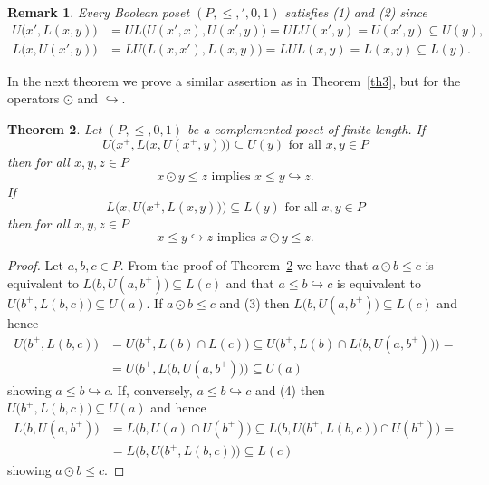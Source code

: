 \documentclass[12pt]{article}
\newtheorem{theorem}{Theorem}[section]
\newtheorem{remark}[theorem]{Remark}
\begin{document}
\begin{remark}
Every Boolean poset $(P,\le,{}',0,1)$ satisfies {\rm(1)} and {\rm(2)} since
\begin{align*}
U\big(x',L(x,y)\big) & =UL\big(U(x',x),U(x',y)\big)=ULU(x',y)=U(x',y)\subseteq U(y), \\
L\big(x,U(x',y)\big) & =LU\big(L(x,x'),L(x,y)\big)=LUL(x,y)=L(x,y)\subseteq L(y).
\end{align*}
\end{remark}	

In the next theorem we prove a similar assertion as in Theorem~\ref{th3}, but for the operators $\odot$ and $\hookrightarrow$.

\begin{theorem}\label{th4}
Let $(P,\le,0,1)$ be a complemented poset of finite length. If
\begin{equation}
U\Big(x^+,L\big(x,U(x^+,y)\big)\Big)\subseteq U(y)\text{ for all }x,y\in P
\end{equation}
then for all $x,y,z\in P$
\[
x\odot y\le z\text{ implies }x\le y\hookrightarrow z.
\]
If
\begin{equation}
L\Big(x,U\big(x^+,L(x,y)\big)\Big)\subseteq L(y)\text{ for all }x,y\in P
\end{equation}
then for all $x,y,z\in P$
\[
x\le y\hookrightarrow z\text{ implies }x\odot y\le z.
\]
\end{theorem}

\begin{proof}
Let $a,b,c\in P$. From the proof of Theorem~\ref{th4} we have that $a\odot b\le c$ is equivalent to $L\big(b,U(a,b^+)\big)\subseteq L(c)$ and that $a\le b\hookrightarrow c$ is equivalent to $U\big(b^+,L(b,c)\big)\subseteq U(a)$. If $a\odot b\le c$ and (3) then $L\big(b,U(a,b^+)\big)\subseteq L(c)$ and hence
\begin{align*}
U\big(b^+,L(b,c)\big) & =U\big(b^+,L(b)\cap L(c)\big)\subseteq U\Big(b^+,L(b)\cap L\big(b,U(a,b^+)\big)\Big)= \\
                      & =U\Big(b^+,L\big(b,U(a,b^+)\big)\Big)\subseteq U(a)
\end{align*}
showing $a\le b\hookrightarrow c$. If, conversely, $a\le b\hookrightarrow c$ and (4) then $U\big(b^+,L(b,c)\big)\subseteq U(a)$ and hence
\begin{align*}
L\big(b,U(a,b^+)\big) & = L\big(b,U(a)\cap U(b^+)\big)\subseteq L\Big(b,U\big(b^+,L(b,c)\big)\cap U(b^+)\Big)= \\
                      & =L\Big(b,U\big(b^+,L(b,c)\big)\Big)\subseteq L(c)
\end{align*}
showing $a\odot b\le c$.
\end{proof}
\end{document}
